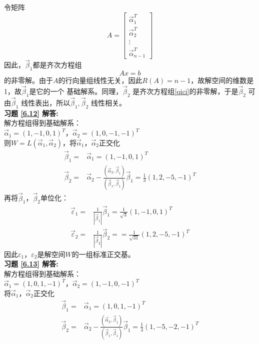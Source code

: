 令矩阵
\begin{equation*}
A=\begin{bmatrix}\vec{\alpha}_1^T\\ \vec{\alpha}_2^T\\ \vdots\\ \vec{\alpha}_{n-1}^T\end{bmatrix}
\end{equation*}
因此，$\vec{\beta}_1$都是齐次方程组
\begin{equation}\label{qici}
Ax=b
\end{equation}
的非零解。由于$A$的行向量组线性无关，因此$R(A)=n-1$，故解空间的维数是1，故$\vec{\beta}_1$是它的一个
基础解系。同理，$\vec{\beta}_2$ 是齐次方程组\eqref{qici}的非零解，于是$\vec{\beta}_2$ 可由$\vec{\beta}_1$
线性表出，所以$\vec{\beta}_1,\vec{\beta}_2$ 线性相关。 \\
\textbf{习题 \ref{6.12} 解答:}\\
解方程组得到基础解系：\\
$\vec{\alpha}_1=(1,-1,0,1)^T$，$\vec{\alpha}_2=(1,0,-1,-1)^T$\\
则$W=L(\vec{\alpha}_1,\vec{\alpha}_2)$，将$\vec{\alpha}_1$，$\vec{\alpha}_2$正交化
\begin{align*}
\vec{\beta}_1=&\vec{\alpha}_1=(1,-1,0,1)^T\\
\vec{\beta}_2=&\vec{\alpha}_2-\frac{(\vec{\alpha}_2,\vec{\beta}_1)}{(\vec{\beta}_1,\vec{\beta}_1)}\vec{\beta}_1=\frac{1}{3}(1,2,-5,-1)^T
\end{align*}
再将$\vec{\beta}_1$，$\vec{\beta}_2$单位化：
\begin{align*}
\vec{\varepsilon}_1=&\frac{1}{|\vec{\beta}_1|}\vec{\beta}_1=\frac{1}{\sqrt{3}}(1,-1,0,1)^T\\
\vec{\varepsilon}_2=&\frac{1}{|\vec{\beta}_2|}\vec{\beta}_2==\frac{1}{\sqrt{31}}(1,2,-5,-1)^T
\end{align*}
因此$\varepsilon_1$，$\varepsilon_2$是解空间$W$的一组标准正交基。\\
\textbf{习题 \ref{6.13} 解答:}\\
解方程组得到基础解系：\\
$\vec{\alpha}_1=(1,0,1,-1)^T$，$\vec{\alpha}_2=(1,-1,0,-1)^T$\\
将$\vec{\alpha}_1$，$\vec{\alpha}_2$正交化
\begin{align*}
\vec{\beta}_1=&\vec{\alpha}_1=(1,0,1,-1)^T\\
\vec{\beta}_2=&\vec{\alpha}_2-\frac{(\vec{\alpha}_2,\vec{\beta}_1)}{(\vec{\beta}_1,\vec{\beta}_1)}\vec{\beta}_1=\frac{1}{3}(1,-5,-2,-1)^T\\
\end{align*}
